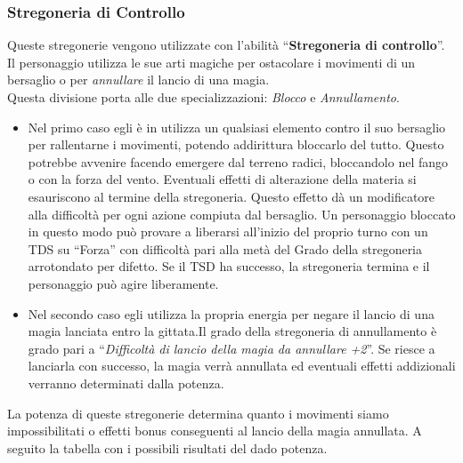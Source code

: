 \documentclass[../manuale_main.tex]{subfiles}
\begin{document}
\subsubsection{Stregoneria di Controllo}
Queste stregonerie vengono utilizzate con l'abilità ``\textbf{Stregoneria di controllo}''.\\
Il personaggio utilizza le sue arti magiche per ostacolare i movimenti di un bersaglio o per \emph{annullare} il lancio di una magia. \\
Questa divisione porta alle due specializzazioni: \emph{Blocco} e \emph{Annullamento}.\\
\begin{itemize}
\item Nel primo caso egli è in utilizza un qualsiasi elemento contro il suo bersaglio per rallentarne i movimenti, potendo addirittura bloccarlo del tutto. Questo potrebbe avvenire facendo emergere dal terreno radici, bloccandolo nel fango o con la forza del vento. Eventuali effetti di alterazione della materia si esauriscono al termine della stregoneria. Questo effetto dà un modificatore alla difficoltà per ogni azione compiuta dal bersaglio. Un personaggio bloccato in questo modo può provare a liberarsi all'inizio del proprio turno con un TDS su ``Forza'' con difficoltà pari alla metà del Grado della stregoneria arrotondato per difetto. Se il TSD ha successo, la stregoneria termina e il personaggio può agire liberamente.
\item Nel secondo caso egli utilizza la propria energia per negare il lancio di una magia lanciata entro la gittata.Il grado della stregoneria di annullamento è grado pari a ``\emph{Difficoltà di lancio della magia da annullare +2}''. Se riesce a lanciarla con successo, la magia verrà annullata ed eventuali effetti addizionali verranno determinati dalla potenza.
\end{itemize}
La potenza di queste stregonerie determina quanto i movimenti siamo impossibilitati o effetti bonus conseguenti al lancio della magia annullata. A seguito la tabella con i possibili risultati del dado potenza.\\
\end{document}
